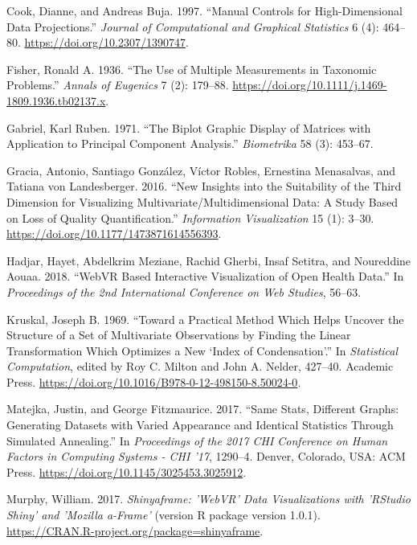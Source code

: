 \documentclass[
  11,
]{article}
\begin{document}
\leavevmode\hypertarget{ref-cook_manual_1997}{}%
Cook, Dianne, and Andreas Buja. 1997. ``Manual Controls for High-Dimensional Data Projections.'' \emph{Journal of Computational and Graphical Statistics} 6 (4): 464--80. \url{https://doi.org/10.2307/1390747}.

\leavevmode\hypertarget{ref-fisher_use_1936}{}%
Fisher, Ronald A. 1936. ``The Use of Multiple Measurements in Taxonomic Problems.'' \emph{Annals of Eugenics} 7 (2): 179--88. \url{https://doi.org/10.1111/j.1469-1809.1936.tb02137.x}.

\leavevmode\hypertarget{ref-gabriel_biplot_1971}{}%
Gabriel, Karl Ruben. 1971. ``The Biplot Graphic Display of Matrices with Application to Principal Component Analysis.'' \emph{Biometrika} 58 (3): 453--67.

\leavevmode\hypertarget{ref-gracia_new_2016}{}%
Gracia, Antonio, Santiago González, Víctor Robles, Ernestina Menasalvas, and Tatiana von Landesberger. 2016. ``New Insights into the Suitability of the Third Dimension for Visualizing Multivariate/Multidimensional Data: A Study Based on Loss of Quality Quantification.'' \emph{Information Visualization} 15 (1): 3--30. \url{https://doi.org/10.1177/1473871614556393}.

\leavevmode\hypertarget{ref-hadjar_webvr_2018}{}%
Hadjar, Hayet, Abdelkrim Meziane, Rachid Gherbi, Insaf Setitra, and Noureddine Aouaa. 2018. ``WebVR Based Interactive Visualization of Open Health Data.'' In \emph{Proceedings of the 2nd International Conference on Web Studies}, 56--63.

\leavevmode\hypertarget{ref-kruskal_toward_1969}{}%
Kruskal, Joseph B. 1969. ``Toward a Practical Method Which Helps Uncover the Structure of a Set of Multivariate Observations by Finding the Linear Transformation Which Optimizes a New `Index of Condensation'.'' In \emph{Statistical Computation}, edited by Roy C. Milton and John A. Nelder, 427--40. Academic Press. \url{https://doi.org/10.1016/B978-0-12-498150-8.50024-0}.

\leavevmode\hypertarget{ref-matejka_same_2017}{}%
Matejka, Justin, and George Fitzmaurice. 2017. ``Same Stats, Different Graphs: Generating Datasets with Varied Appearance and Identical Statistics Through Simulated Annealing.'' In \emph{Proceedings of the 2017 CHI Conference on Human Factors in Computing Systems - CHI '17}, 1290--4. Denver, Colorado, USA: ACM Press. \url{https://doi.org/10.1145/3025453.3025912}.

\leavevmode\hypertarget{ref-murphy_shinyaframe_2017}{}%
Murphy, William. 2017. \emph{Shinyaframe: 'WebVR' Data Visualizations with 'RStudio Shiny' and 'Mozilla a-Frame'} (version R package version 1.0.1). \url{https://CRAN.R-project.org/package=shinyaframe}.
\end{document}
